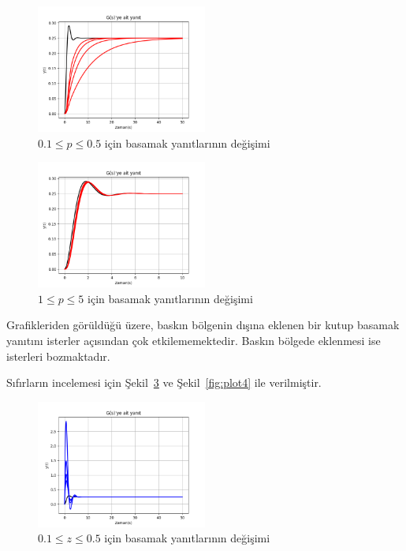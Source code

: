 \begin{figure}[!htb]
    \centering
    \includegraphics[width=0.5\textwidth]{plot1}
    \caption{$0.1\leq p\leq 0.5$ için basamak yanıtlarının değişimi}\label{fig:plot1}
\end{figure}

\begin{figure}[!htb]
    \centering
    \includegraphics[width=0.5\textwidth]{plot2}
    \caption{$1\leq p\leq 5$ için basamak yanıtlarının değişimi}\label{fig:plot2}
\end{figure}

Grafikleriden görüldüğü üzere, baskın bölgenin dışına eklenen bir kutup basamak yanıtını isterler açısından çok etkilememektedir. Baskın bölgede eklenmesi ise isterleri bozmaktadır.

Sıfırların incelemesi için Şekil~\ref{fig:plot3} ve Şekil~\ref{fig:plot4} ile verilmiştir. 

\begin{figure}[!htb]
    \centering
    \includegraphics[width=0.5\textwidth]{plot3}
    \caption{$0.1\leq z\leq 0.5$ için basamak yanıtlarının değişimi}\label{fig:plot3}
\end{figure}

